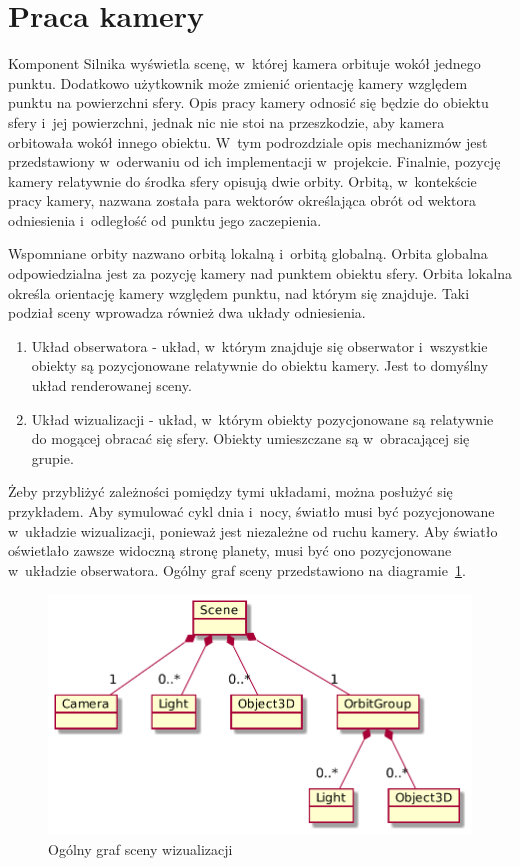 \section{Praca kamery}
\label{sec:camera}

Komponent Silnika wyświetla scenę, w~której kamera orbituje wokół jednego punktu. Dodatkowo użytkownik może zmienić orientację kamery względem punktu na powierzchni sfery. Opis pracy kamery odnosić się będzie do obiektu sfery i~jej powierzchni, jednak nic nie stoi na przeszkodzie, aby kamera orbitowała wokół innego obiektu. W~tym podrozdziale opis mechanizmów jest przedstawiony w~oderwaniu od ich implementacji w~projekcie. Finalnie, pozycję kamery relatywnie do środka sfery opisują dwie orbity. Orbitą, w~kontekście pracy kamery, nazwana została para wektorów określająca obrót od wektora odniesienia i~odległość od punktu jego zaczepienia.

Wspomniane orbity nazwano orbitą lokalną i~orbitą globalną. Orbita globalna odpowiedzialna jest za pozycję kamery nad punktem obiektu sfery. Orbita lokalna określa orientację kamery względem punktu, nad którym się znajduje. Taki podział sceny wprowadza również dwa układy odniesienia.

\begin{enumerate}
    \item Układ obserwatora - układ, w~którym znajduje się obserwator i~wszystkie obiekty są pozycjonowane relatywnie do obiektu kamery. Jest to domyślny układ renderowanej sceny.
    \item Układ wizualizacji - układ, w~którym obiekty pozycjonowane są relatywnie do mogącej obracać się sfery. Obiekty umieszczane są w~obracającej się grupie.
\end{enumerate}

Żeby przybliżyć zależności pomiędzy tymi układami, można posłużyć się przykładem. Aby symulować cykl dnia i~nocy, światło musi być pozycjonowane w~układzie wizualizacji, ponieważ jest niezależne od ruchu kamery. Aby światło oświetlało zawsze widoczną stronę planety, musi być ono pozycjonowane w~układzie obserwatora. Ogólny graf sceny przedstawiono na diagramie~\ref{fig:c3_scene_graph}.

\begin{figure}[h]
    \centering
    \includegraphics[scale=0.3]{diagrams/out/c3_scene_graph.png}
    \caption{Ogólny graf sceny wizualizacji}
    \label{fig:c3_scene_graph}
\end{figure}

